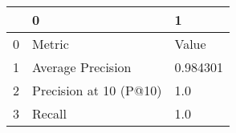 \begin{tabular}{lll}
\toprule
{} &                       0 &         1 \\
\midrule
0 &                  Metric &     Value \\
1 &       Average Precision &  0.984301 \\
2 &  Precision at 10 (P@10) &       1.0 \\
3 &                  Recall &       1.0 \\
\bottomrule
\end{tabular}
